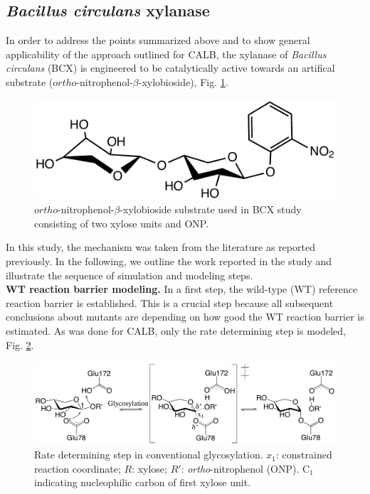 \subsection{\textit{Bacillus circulans} xylanase}
In order to address the points summarized above and to show general applicability of the approach outlined for CALB, the xylanase of \textit{Bacillus circulans} (BCX) is engineered to be catalytically active towards an artifical substrate ($ortho$-nitrophenol-$\beta$-xylobioside), Fig. \ref{fig:substrate}.
\begin{figure}[htbp] 
\centering
\includegraphics[width=0.85\linewidth]{substrate.pdf}
\caption{
$ortho$-nitrophenol-$\beta$-xylobioside substrate used in BCX study consisting of two xylose units and ONP.
}
\label{fig:substrate}
\end{figure}
In this study, the mechanism was taken from the literature as reported previously\cite{joshi2000hydrogen,joshi2001dissecting}.
In the following, we outline the work reported in the study and illustrate the sequence of simulation and modeling steps.\\
\textbf{WT reaction barrier modeling.}
In a first step, the wild-type (WT) reference reaction barrier is established.
This is a crucial step because all subsequent conclusions about mutants are depending on how good the WT reaction barrier is estimated.
As was done for CALB, only the rate determining step is modeled, Fig. \ref{fig:bcx_mechanism}.
\begin{figure}[htbp] 
\centering
\includegraphics[width=1.0\linewidth]{mechanism.pdf}
\caption{
Rate determining step in conventional glycosylation. $x_1$: constrained reaction coordinate; $R$: xylose; 
$R'$: \textit{ortho}-nitrophenol (ONP).
C$_1$ indicating nucleophilic carbon of first xylose unit\cite{hediger2013computational}.
}
\label{fig:bcx_mechanism}
\end{figure}
